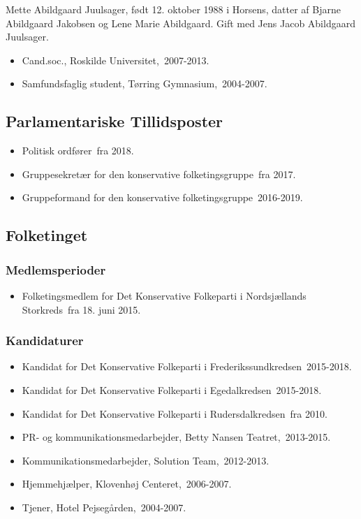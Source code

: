 \documentclass[11pt, a4paper]{awesome-cv}
\begin{document}
\makecvheader[R]
\makelettertitle
\begin{cvletter}
Mette Abildgaard Juulsager, født 12. oktober 1988 i Horsens, datter af Bjarne Abildgaard Jakobsen og Lene Marie Abildgaard. Gift med Jens Jacob Abildgaard Juulsager.

\begin{itemize}
\item Cand.soc., Roskilde Universitet, 2007-2013.
\item Samfundsfaglig student, Tørring Gymnasium, 2004-2007.
\end{itemize}
\subsection*{Parlamentariske Tillidsposter}
\begin{itemize}
\item Politisk ordfører fra 2018.
\item Gruppesekretær for den konservative folketingsgruppe fra 2017.
\item Gruppeformand for den konservative folketingsgruppe 2016-2019.
\end{itemize}
\subsection*{Folketinget}
\subsubsection*{Medlemsperioder}
\begin{itemize}
\item Folketingsmedlem for Det Konservative Folkeparti i Nordsjællands Storkreds fra 18. juni 2015.
\end{itemize}
\subsubsection*{Kandidaturer}
\begin{itemize}
\item Kandidat for Det Konservative Folkeparti i Frederikssundkredsen 2015-2018.
\item Kandidat for Det Konservative Folkeparti i Egedalkredsen 2015-2018.
\item Kandidat for Det Konservative Folkeparti i Rudersdalkredsen fra 2010.
\end{itemize}
\begin{itemize}
\item PR- og kommunikationsmedarbejder, Betty Nansen Teatret, 2013-2015.
\item Kommunikationsmedarbejder, Solution Team, 2012-2013.
\item Hjemmehjælper, Klovenhøj Centeret, 2006-2007.
\item Tjener, Hotel Pejsegården, 2004-2007.
\end{itemize}
\end{cvletter}
\end{document}
